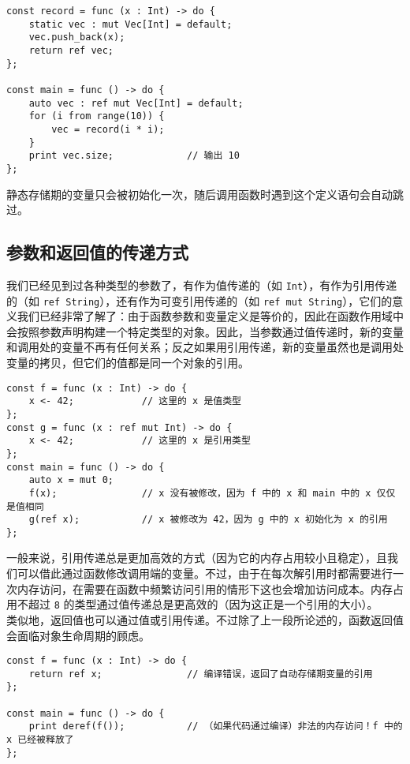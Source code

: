 \begin{lstlisting}
const record = func (x : Int) -> do {
	static vec : mut Vec[Int] = default;
	vec.push_back(x);
	return ref vec;
};

const main = func () -> do {
	auto vec : ref mut Vec[Int] = default;
	for (i from range(10)) {
		vec = record(i * i);
	}
	print vec.size;				// 输出 10
};
\end{lstlisting}

静态存储期的变量只会被初始化一次，随后调用函数时遇到这个定义语句会自动跳过。

\subsection{参数和返回值的传递方式}

我们已经见到过各种类型的参数了，有作为值传递的（如 \lstinline!Int!），有作为引用传递的（如 \lstinline!ref String!），还有作为可变引用传递的（如 \lstinline!ref mut String!），它们的意义我们已经非常了解了：由于函数参数和变量定义是等价的，因此在函数作用域中会按照参数声明构建一个特定类型的对象。因此，当参数通过值传递时，新的变量和调用处的变量不再有任何关系；反之如果用引用传递，新的变量虽然也是调用处变量的拷贝，但它们的值都是同一个对象的引用。

\begin{lstlisting}
const f = func (x : Int) -> do {
	x <- 42;			// 这里的 x 是值类型
};
const g = func (x : ref mut Int) -> do {
	x <- 42;			// 这里的 x 是引用类型
};
const main = func () -> do {
	auto x = mut 0;
	f(x);				// x 没有被修改，因为 f 中的 x 和 main 中的 x 仅仅是值相同
	g(ref x);			// x 被修改为 42，因为 g 中的 x 初始化为 x 的引用
};
\end{lstlisting}

一般来说，引用传递总是更加高效的方式（因为它的内存占用较小且稳定），且我们可以借此通过函数修改调用端的变量。不过，由于在每次解引用时都需要进行一次内存访问，在需要在函数中频繁访问引用的情形下这也会增加访问成本。内存占用不超过 \lstinline!8! 的类型通过值传递总是更高效的（因为这正是一个引用的大小）。 \\

类似地，返回值也可以通过值或引用传递。不过除了上一段所论述的，函数返回值会面临对象生命周期的顾虑。

\begin{lstlisting}
const f = func (x : Int) -> do {
	return ref x;				// 编译错误，返回了自动存储期变量的引用
};

const main = func () -> do {
	print deref(f());			// （如果代码通过编译）非法的内存访问！f 中的 x 已经被释放了
};
\end{lstlisting}


